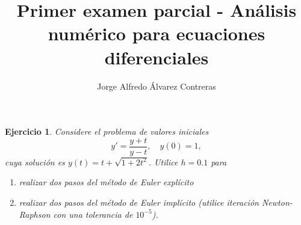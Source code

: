 \documentclass[11pt,letterpaper]{article}
\title{Primer examen parcial - Análisis numérico para ecuaciones
diferenciales}
\author{Jorge Alfredo Álvarez Contreras}
\newtheorem{exercise}{Ejercicio}
\begin{document}
\maketitle

\begin{exercise}
  Considere el problema de valores iniciales
  \begin{equation}
    y' = \frac{y+t}{y-t}, \quad y(0)=1
  ,\end{equation}
  cuya solución es $y(t)=t+\sqrt{1+2t^{2}}$. Utilice $h=0.1$ para
  \begin{enumerate}
    \item
      realizar dos pasos del método de Euler explícito
    \item
      realizar dos pasos del método de Euler implícito (utilice
      iteración Newton-Raphson con una tolerancia de $10^{-5}$).
  \end{enumerate}
\end{exercise}
\end{document}
